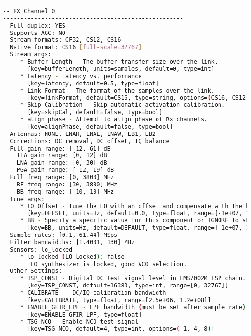 \begin{appendices}
\begin{lstlisting}[language=bash, caption={SoapySDRUtil Probe Output for LimeSDR}, label={lst: soapyProbe}]
----------------------------------------------------
-- RX Channel 0
----------------------------------------------------
  Full-duplex: YES
  Supports AGC: NO
  Stream formats: CF32, CS12, CS16
  Native format: CS16 [full-scale=32767]
  Stream args:
     * Buffer Length - The buffer transfer size over the link.
       [key=bufferLength, units=samples, default=0, type=int]
     * Latency - Latency vs. performance
       [key=latency, default=0.5, type=float]
     * Link Format - The format of the samples over the link.
       [key=linkFormat, default=CS16, type=string, options=(CS16, CS12)]
     * Skip Calibration - Skip automatic activation calibration.
       [key=skipCal, default=false, type=bool]
     * align phase - Attempt to align phase of Rx channels.
       [key=alignPhase, default=false, type=bool]
  Antennas: NONE, LNAH, LNAL, LNAW, LB1, LB2
  Corrections: DC removal, DC offset, IQ balance
  Full gain range: [-12, 61] dB
    TIA gain range: [0, 12] dB
    LNA gain range: [0, 30] dB
    PGA gain range: [-12, 19] dB
  Full freq range: [0, 3800] MHz
    RF freq range: [30, 3800] MHz
    BB freq range: [-10, 10] MHz
  Tune args:
     * LO Offset - Tune the LO with an offset and compensate with the baseband CORDIC.
       [key=OFFSET, units=Hz, default=0.0, type=float, range=[-1e+07, 1e+07]]
     * BB - Specify a specific value for this component or IGNORE to skip tuning it.
       [key=BB, units=Hz, default=DEFAULT, type=float, range=[-1e+07, 1e+07], options=(DEFAULT, IGNORE)]
  Sample rates: [0.1, 61.44] MSps
  Filter bandwidths: [1.4001, 130] MHz
  Sensors: lo_locked
     * lo_locked (LO Locked): false
        LO synthesizer is locked, good VCO selection.
  Other Settings:
     * TSP_CONST - Digital DC test signal level in LMS7002M TSP chain.
       [key=TSP_CONST, default=16383, type=int, range=[0, 32767]]
     * CALIBRATE -  DC/IQ calibration bandwidth
       [key=CALIBRATE, type=float, range=[2.5e+06, 1.2e+08]]
     * ENABLE_GFIR_LPF - LPF bandwidth (must be set after sample rate)
       [key=ENABLE_GFIR_LPF, type=float]
     * TSG_NCO - Enable NCO test signal
       [key=TSG_NCO, default=4, type=int, options=(-1, 4, 8)]


\end{lstlisting}
\end{appendices}
